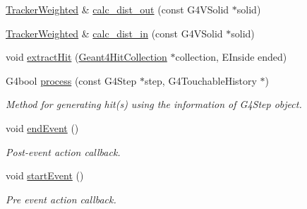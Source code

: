 \begin{DoxyCompactItemize}
\hyperlink{struct_d_d4hep_1_1_simulation_1_1_tracker_weighted}{Tracker\+Weighted} \& \hyperlink{struct_d_d4hep_1_1_simulation_1_1_tracker_weighted_ac7628c08fbf29a1dc2133ac7b30e1499}{calc\+\_\+dist\+\_\+out} (const G4\+V\+Solid $\ast$solid)
\item 
\hyperlink{struct_d_d4hep_1_1_simulation_1_1_tracker_weighted}{Tracker\+Weighted} \& \hyperlink{struct_d_d4hep_1_1_simulation_1_1_tracker_weighted_aa9139da9ecb7c109b7108cc27a27c13d}{calc\+\_\+dist\+\_\+in} (const G4\+V\+Solid $\ast$solid)
\item 
void \hyperlink{struct_d_d4hep_1_1_simulation_1_1_tracker_weighted_a690b6f7fdcda6bbec2e7cb89f4fce9af}{extract\+Hit} (\hyperlink{class_d_d4hep_1_1_simulation_1_1_geant4_hit_collection}{Geant4\+Hit\+Collection} $\ast$collection, E\+Inside ended)
\item 
G4bool \hyperlink{struct_d_d4hep_1_1_simulation_1_1_tracker_weighted_ab258cb542897a7bd369fd204eafbb245}{process} (const G4\+Step $\ast$step, G4\+Touchable\+History $\ast$)
\begin{DoxyCompactList}\small\item\em Method for generating hit(s) using the information of G4\+Step object. \end{DoxyCompactList}\item 
void \hyperlink{struct_d_d4hep_1_1_simulation_1_1_tracker_weighted_aa489deb875d6f5867917d2b7aae00747}{end\+Event} ()
\begin{DoxyCompactList}\small\item\em Post-\/event action callback. \end{DoxyCompactList}\item 
void \hyperlink{struct_d_d4hep_1_1_simulation_1_1_tracker_weighted_a15fd630fa0e1ca7e3c0516952ad5f976}{start\+Event} ()
\begin{DoxyCompactList}\small\item\em Pre event action callback. \end{DoxyCompactList}\end{DoxyCompactItemize}
